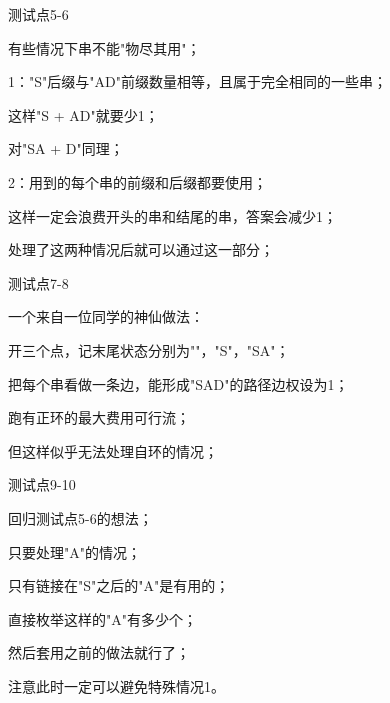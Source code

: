 \documentclass{beamer}
\begin{document}
\begin{frame}{测试点5-6}

	\par 有些情况下串不能"物尽其用"；

	\pause

	\par 1："S"后缀与"AD"前缀数量相等，且属于完全相同的一些串；

	\pause

	\par 这样"S + AD"就要少1；

	\par 对"SA + D"同理；

	\pause

	\par 2：用到的每个串的前缀和后缀都要使用；

	\pause

	\par 这样一定会浪费开头的串和结尾的串，答案会减少1；

	\pause

	\par 处理了这两种情况后就可以通过这一部分；
	
\end{frame}

\begin{frame}{测试点7-8}

	\par 一个来自一位同学的神仙做法：

	\pause

	\par 开三个点，记末尾状态分别为""，"S"，"SA"；

	\par 把每个串看做一条边，能形成"SAD"的路径边权设为1；

	\pause

	\par 跑有正环的最大费用可行流；

	\pause

	\par 但这样似乎无法处理自环的情况；

\end{frame}

\begin{frame}{测试点9-10}

	\par 回归测试点5-6的想法；

	\par 只要处理"A"的情况；

	\pause

	\par 只有链接在"S"之后的"A"是有用的；

	\pause

	\par 直接枚举这样的"A"有多少个；

	\par 然后套用之前的做法就行了；

	\pause

	\par 注意此时一定可以避免特殊情况1。

\end{frame}
\end{document}
